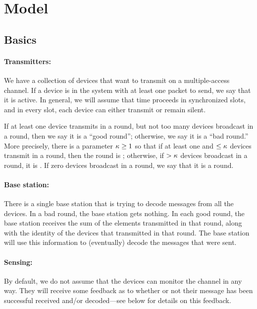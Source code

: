 \section{Model}
 
\subsection{Basics}

\paragraph{Transmitters:} We have a collection of devices that want to transmit on a multiple-access channel.  
If a device is in the system with at least one packet to send, we say that it is active.  In general, we will assume that time proceeds in synchronized slots, and in every slot, each device can either transmit or remain silent.  

If at least one device transmits in a round, but not too many devices broadcast in a round, then we say it is a ``good round''; otherwise, we say it is a ``bad round.''  More precisely, there is a parameter $\kappa \geq 1$ so that if at least one and $\leq \kappa$ devices transmit in a round, then the round is ; otherwise, if $> \kappa$ devices broadcast in a round, it is .  If zero devices broadcast in a round, we say that it is a  round. 


\paragraph{Base station:} There is a single base station that is trying to decode messages from all the devices.  In a bad round, the base station gets nothing.  In each good round, the base station receives the sum of the elements transmitted in that round, along with the identity of the devices that transmitted in that round.  
The base station will use this information to (eventually) decode the messages that were sent.

\paragraph{Sensing:} By default, we do not assume that the devices can monitor the channel in any way.  They will receive some feedback as to whether or not their message has been successful received and/or decoded---see below for details on this feedback.  

